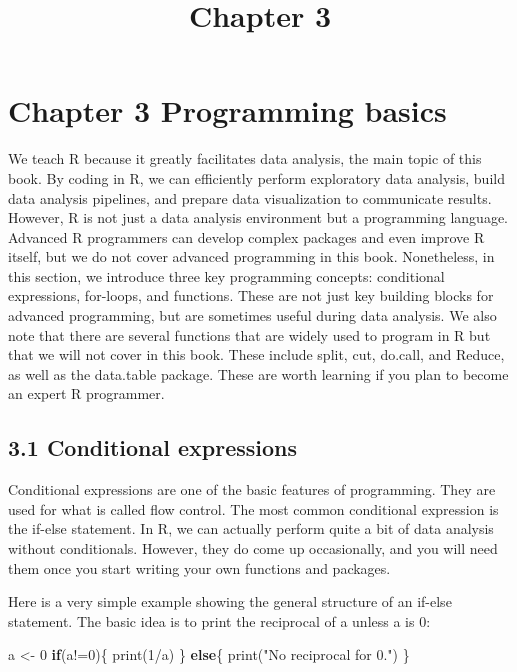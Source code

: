 \documentclass[
]{article}
\title{Chapter 3}
\author{}
\date{\vspace{-2.5em}}
\newenvironment{Shaded}{\begin{snugshade}}{\end{snugshade}}
\newcommand{\ControlFlowTok}[1]{\textcolor[rgb]{0.13,0.29,0.53}{\textbf{#1}}}
\newcommand{\DecValTok}[1]{\textcolor[rgb]{0.00,0.00,0.81}{#1}}
\newcommand{\FunctionTok}[1]{\textcolor[rgb]{0.00,0.00,0.00}{#1}}
\newcommand{\NormalTok}[1]{#1}
\newcommand{\OtherTok}[1]{\textcolor[rgb]{0.56,0.35,0.01}{#1}}
\newcommand{\SpecialCharTok}[1]{\textcolor[rgb]{0.00,0.00,0.00}{#1}}
\newcommand{\StringTok}[1]{\textcolor[rgb]{0.31,0.60,0.02}{#1}}
\begin{document}
\maketitle

\hypertarget{chapter-3-programming-basics}{%
\section{Chapter 3 Programming
basics}\label{chapter-3-programming-basics}}

We teach R because it greatly facilitates data analysis, the main topic
of this book. By coding in R, we can efficiently perform exploratory
data analysis, build data analysis pipelines, and prepare data
visualization to communicate results. However, R is not just a data
analysis environment but a programming language. Advanced R programmers
can develop complex packages and even improve R itself, but we do not
cover advanced programming in this book. Nonetheless, in this section,
we introduce three key programming concepts: conditional expressions,
for-loops, and functions. These are not just key building blocks for
advanced programming, but are sometimes useful during data analysis. We
also note that there are several functions that are widely used to
program in R but that we will not cover in this book. These include
split, cut, do.call, and Reduce, as well as the data.table package.
These are worth learning if you plan to become an expert R programmer.

\hypertarget{conditional-expressions}{%
\subsection{3.1 Conditional expressions}\label{conditional-expressions}}

Conditional expressions are one of the basic features of programming.
They are used for what is called flow control. The most common
conditional expression is the if-else statement. In R, we can actually
perform quite a bit of data analysis without conditionals. However, they
do come up occasionally, and you will need them once you start writing
your own functions and packages.

Here is a very simple example showing the general structure of an
if-else statement. The basic idea is to print the reciprocal of a unless
a is 0:

\begin{Shaded}
\begin{Highlighting}[]
\NormalTok{a }\OtherTok{\textless{}{-}} \DecValTok{0}
\ControlFlowTok{if}\NormalTok{(a}\SpecialCharTok{!=}\DecValTok{0}\NormalTok{)\{}
  \FunctionTok{print}\NormalTok{(}\DecValTok{1}\SpecialCharTok{/}\NormalTok{a)}
\NormalTok{\} }\ControlFlowTok{else}\NormalTok{\{}
  \FunctionTok{print}\NormalTok{(}\StringTok{"No reciprocal for 0."}\NormalTok{)}
\NormalTok{\}}
\end{Highlighting}
\end{Shaded}
\end{document}
